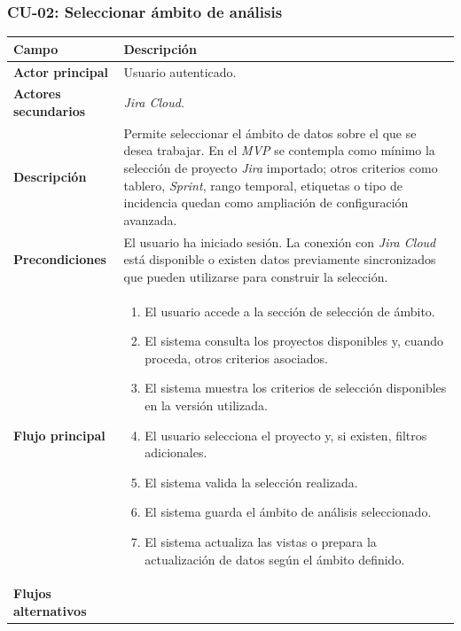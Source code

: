 \clearpage
\subsubsection{CU-02: Seleccionar ámbito de análisis}

{\renewcommand{\arraystretch}{1.25}\footnotesize
\begin{longtable}{p{3.2cm}p{10.2cm}}
\toprule
\textbf{Campo} & \textbf{Descripción} \\
\midrule
\textbf{Actor principal} & Usuario autenticado. \\
\textbf{Actores secundarios} & \textit{Jira Cloud}. \\
\textbf{Descripción} & Permite seleccionar el ámbito de datos sobre el que se desea trabajar. En el \textit{MVP} se contempla como mínimo la selección de proyecto \textit{Jira} importado; otros criterios como tablero, \textit{Sprint}, rango temporal, etiquetas o tipo de incidencia quedan como ampliación de configuración avanzada. \\
\textbf{Precondiciones} & El usuario ha iniciado sesión. La conexión con \textit{Jira Cloud} está disponible o existen datos previamente sincronizados que pueden utilizarse para construir la selección. \\
\textbf{Flujo principal} & \begin{minipage}[t]{10.2cm}\begin{enumerate}[noitemsep,leftmargin=*]
    \item El usuario accede a la sección de selección de ámbito.
    \item El sistema consulta los proyectos disponibles y, cuando proceda, otros criterios asociados.
    \item El sistema muestra los criterios de selección disponibles en la versión utilizada.
    \item El usuario selecciona el proyecto y, si existen, filtros adicionales.
    \item El sistema valida la selección realizada.
    \item El sistema guarda el ámbito de análisis seleccionado.
    \item El sistema actualiza las vistas o prepara la actualización de datos según el ámbito definido.
\end{enumerate}\end{minipage} \\
\textbf{Flujos alternativos} & \begin{minipage}[t]{10.2cm}\begin{itemize}[noitemsep,leftmargin=*]

\end{itemize}
\end{minipage}
\end{longtable}}
